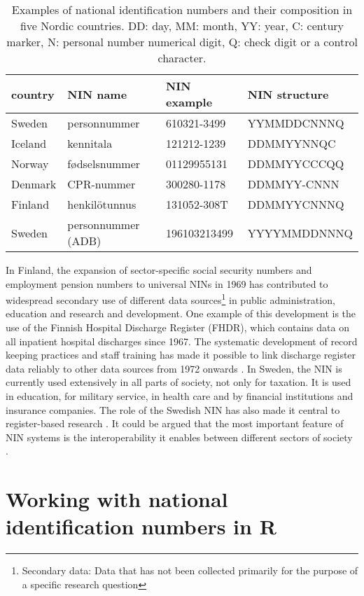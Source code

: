 \begin{table}[ht]
\centering
\begin{tabular}{llll}
\toprule
  country & NIN name & NIN example & NIN structure \\
  \hline
  Sweden & personnummer & 610321-3499 & YYMMDDCNNNQ \\
  Iceland & kennitala & 121212-1239 & DDMMYYNNQC \\
  Norway & fødselsnummer & 01129955131 & DDMMYYCCCQQ \\
  Denmark & CPR-nummer & 300280-1178 & DDMMYY-CNNN \\
  Finland & henkilötunnus & 131052-308T & DDMMYYCNNNQ \\
  \hline
  Sweden & personnummer (ADB) & 196103213499 & YYYYMMDDNNNQ \\
\bottomrule
\end{tabular}
\caption{Examples of national identification numbers and their composition in five Nordic countries. DD: day, MM: month, YY: year, C: century marker, N: personal number numerical digit, Q: check digit or a control character.}
\label{tab:nordiccomparison2}
\end{table}

In Finland, the expansion of sector-specific social security numbers and employment pension numbers to universal NINs in 1969 has contributed to widespread secondary use of different data sources\footnote{Secondary data: Data that has not been collected primarily for the purpose of a specific research question} in public administration, education and research and development. One example of this development is the use of the Finnish Hospital Discharge Register (FHDR), which contains data on all inpatient hospital discharges since 1967. The systematic development of record keeping practices and staff training has made it possible to link discharge register data reliably to other data sources from 1972 onwards \citep{sund2012}. In Sweden, the NIN is currently used extensively in all parts of society, not only for taxation. It is used in education, for military service, in health care and by financial institutions and insurance companies. The role of the Swedish NIN has also made it central to register-based research \citep{scb2016}. It could be argued that the most important feature of NIN systems is the interoperability it enables between different sectors of society \citep{alastalo2022}.

\section{Working with national identification numbers in R}


